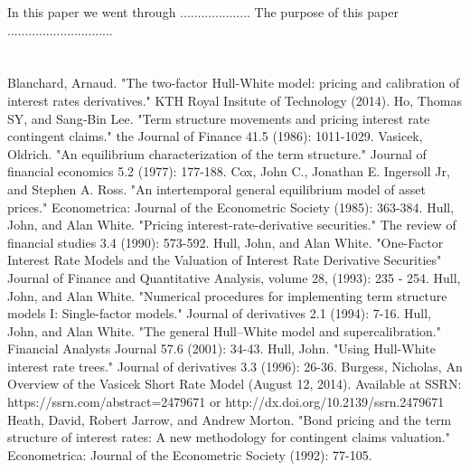 \documentclass{article}
\begin{document}
In this paper we went through ....................  The purpose of this paper ..............................

\newpage
\section*{} \label{bibsection}


\begin{thebibliography}{MMMMM} 
 Blanchard, Arnaud. "The two-factor Hull-White model: pricing and calibration of interest rates derivatives." KTH Royal Insitute of Technology (2014).
 Ho, Thomas SY, and Sang‐Bin Lee. "Term structure movements and pricing interest rate contingent claims." the Journal of Finance 41.5 (1986): 1011-1029.
 Vasicek, Oldrich. "An equilibrium characterization of the term structure." Journal of financial economics 5.2 (1977): 177-188.
 Cox, John C., Jonathan E. Ingersoll Jr, and Stephen A. Ross. "An intertemporal general equilibrium model of asset prices." Econometrica: Journal of the Econometric Society (1985): 363-384.
 Hull, John, and Alan White. "Pricing interest-rate-derivative securities." The review of financial studies 3.4 (1990): 573-592.
 Hull, John, and Alan White. "One-Factor Interest Rate Models and the Valuation of Interest Rate Derivative Securities" Journal of Finance and Quantitative Analysis, volume 28,  (1993): 235 - 254.
 Hull, John, and Alan White. "Numerical procedures for implementing term structure models I: Single-factor models." Journal of derivatives 2.1 (1994): 7-16.
 Hull, John, and Alan White. "The general Hull–White model and supercalibration." Financial Analysts Journal 57.6 (2001): 34-43.
 Hull, John. "Using Hull-White interest rate trees." Journal of derivatives 3.3 (1996): 26-36.
 Burgess, Nicholas, An Overview of the Vasicek Short Rate Model (August 12, 2014). Available at SSRN: https://ssrn.com/abstract=2479671 or http://dx.doi.org/10.2139/ssrn.2479671
 Heath, David, Robert Jarrow, and Andrew Morton. "Bond pricing and the term structure of interest rates: A new methodology for contingent claims valuation." Econometrica: Journal of the Econometric Society (1992): 77-105.



\end{thebibliography}


\end{document}
